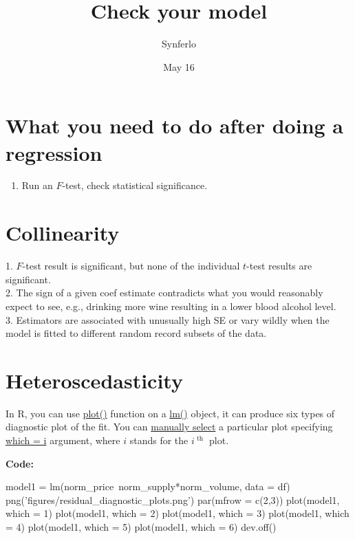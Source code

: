 \documentclass[12pt]{article}
\title{Check your model}
\author{Synferlo}
\date{May 16}
\begin{document}
\maketitle
\newpage



\section{What you need to do after doing a regression}
\begin{enumerate}
\item Run an $ F $-test, check statistical significance.
\end{enumerate}









\section{Collinearity}
1. $ F $-test result is significant, but none of the individual
$ t $-test results are significant.\\

2. The sign of a given coef estimate contradicts what you would 
reasonably expect to see, e.g., drinking more wine resulting in a 
lower blood alcohol level.\\

3. Estimators are associated with unusually high SE or vary wildly when
the model is fitted to different random record subsets of the data.\\







\section{Heteroscedasticity}


In R, you can use {\underline {plot()}} function on a 
{\underline {lm()}} object, it can produce six types of diagnostic
plot of the fit. You can {\underline {manually select}} a particular
plot specifying {\underline {which = i}} argument, where $ i $ stands
for the $ i^{\text{ th }} $ plot.


{\textbf {Code:}}
\begin{rc}
model1 = lm(norm_price~norm_supply*norm_volume, data = df)
png('figures/residual_diagnostic_plots.png')
par(mfrow = c(2,3))
plot(model1, which = 1)
plot(model1, which = 2)
plot(model1, which = 3)
plot(model1, which = 4)
plot(model1, which = 5)
plot(model1, which = 6)
dev.off()
\end{rc}

\begin{figure}[H]
\end{figure}
\end{document}
